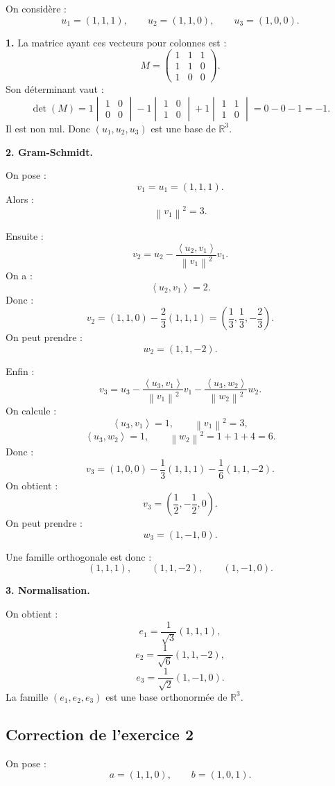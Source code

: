 \documentclass[11pt,a4paper]{article}
\newcommand{\R}{\mathbb R}
\newcommand{\norme}[1]{\left\lVert #1\right\rVert}
\newcommand{\scal}[2]{\left\langle #1,#2\right\rangle}
\begin{document}
On considère :
\[
u_1=(1,1,1),
\qquad
u_2=(1,1,0),
\qquad
u_3=(1,0,0).
\]

\textbf{1.}  
La matrice ayant ces vecteurs pour colonnes est :
\[
M=
\begin{pmatrix}
1&1&1\\
1&1&0\\
1&0&0
\end{pmatrix}.
\]
Son déterminant vaut :
\[
\det(M)
=
1\begin{vmatrix}1&0\\0&0\end{vmatrix}
-
1\begin{vmatrix}1&0\\1&0\end{vmatrix}
+
1\begin{vmatrix}1&1\\1&0\end{vmatrix}
=
0-0-1=-1.
\]
Il est non nul.  
Donc \((u_1,u_2,u_3)\) est une base de \(\R^3\).

\textbf{2. Gram-Schmidt.}

On pose :
\[
v_1=u_1=(1,1,1).
\]
Alors :
\[
\norme{v_1}^2=3.
\]

Ensuite :
\[
v_2=u_2-\frac{\scal{u_2}{v_1}}{\norme{v_1}^2}v_1.
\]
On a :
\[
\scal{u_2}{v_1}=2.
\]
Donc :
\[
v_2=(1,1,0)-\frac23(1,1,1)
=
\left(\frac13,\frac13,-\frac23\right).
\]
On peut prendre :
\[
w_2=(1,1,-2).
\]

Enfin :
\[
v_3=u_3-\frac{\scal{u_3}{v_1}}{\norme{v_1}^2}v_1
-\frac{\scal{u_3}{w_2}}{\norme{w_2}^2}w_2.
\]
On calcule :
\[
\scal{u_3}{v_1}=1,
\qquad
\norme{v_1}^2=3,
\]
\[
\scal{u_3}{w_2}=1,
\qquad
\norme{w_2}^2=1+1+4=6.
\]
Donc :
\[
v_3=(1,0,0)-\frac13(1,1,1)-\frac16(1,1,-2).
\]
On obtient :
\[
v_3=
\left(\frac12,-\frac12,0\right).
\]
On peut prendre :
\[
w_3=(1,-1,0).
\]

Une famille orthogonale est donc :
\[
(1,1,1),
\qquad
(1,1,-2),
\qquad
(1,-1,0).
\]

\textbf{3. Normalisation.}

On obtient :
\[
e_1=\frac1{\sqrt3}(1,1,1),
\]
\[
e_2=\frac1{\sqrt6}(1,1,-2),
\]
\[
e_3=\frac1{\sqrt2}(1,-1,0).
\]
La famille \((e_1,e_2,e_3)\) est une base orthonormée de \(\R^3\).

\subsection*{Correction de l'exercice 2}

On pose :
\[
a=(1,1,0),
\qquad
b=(1,0,1).
\]
\end{document}
